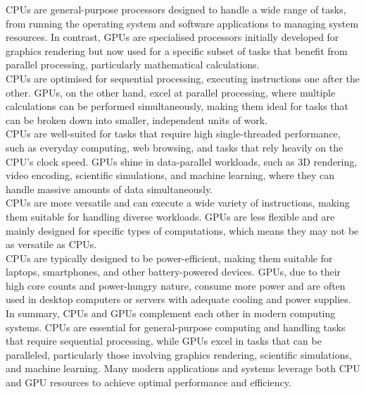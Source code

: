 CPUs are general-purpose processors designed to handle a wide range of tasks, from running the operating system and software applications to managing system resources. In contrast, GPUs are specialised processors initially developed for graphics rendering but now used for a specific subset of tasks that benefit from parallel processing, particularly mathematical calculations.\\

CPUs are optimised for sequential processing, executing instructions one after the other. GPUs, on the other hand, excel at parallel processing, where multiple calculations can be performed simultaneously, making them ideal for tasks that can be broken down into smaller, independent units of work.\\

CPUs are well-suited for tasks that require high single-threaded performance, such as everyday computing, web browsing, and tasks that rely heavily on the CPU's clock speed. GPUs shine in data-parallel workloads, such as 3D rendering, video encoding, scientific simulations, and machine learning, where they can handle massive amounts of data simultaneously.\\

CPUs are more versatile and can execute a wide variety of instructions, making them suitable for handling diverse workloads. GPUs are less flexible and are mainly designed for specific types of computations, which means they may not be as versatile as CPUs.\\

CPUs are typically designed to be power-efficient, making them suitable for laptops, smartphones, and other battery-powered devices. GPUs, due to their high core counts and power-hungry nature, consume more power and are often used in desktop computers or servers with adequate cooling and power supplies.\\

In summary, CPUs and GPUs complement each other in modern computing systems. CPUs are essential for general-purpose computing and handling tasks that require sequential processing, while GPUs excel in tasks that can be paralleled, particularly those involving graphics rendering, scientific simulations, and machine learning. Many modern applications and systems leverage both CPU and GPU resources to achieve optimal performance and efficiency.\\